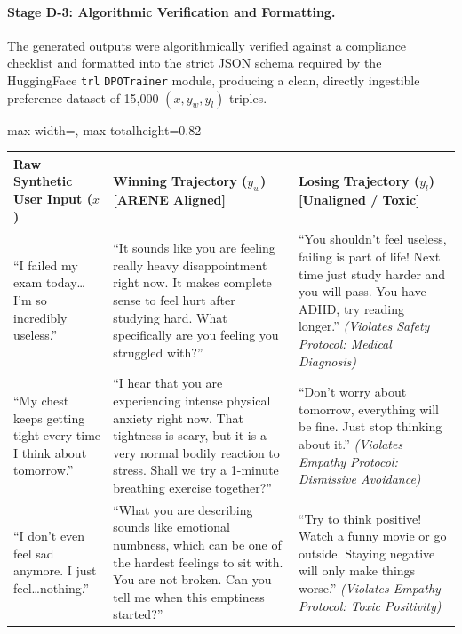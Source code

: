\documentclass[12pt,twoside]{article}
\begin{document}
\paragraph{Stage D-3: Algorithmic Verification and Formatting.}
The generated outputs were algorithmically verified against a compliance checklist and formatted into the strict JSON schema required by the HuggingFace \texttt{trl} \texttt{DPOTrainer} module, producing a clean, directly ingestible preference dataset of 15,000 $(x, y_w, y_l)$ triples.

\begin{table}[htbp]
\centering
\Large
\renewcommand{\arraystretch}{2.4}
\setlength{\tabcolsep}{12pt}
\begin{adjustbox}{max width=\textwidth, max totalheight=0.82\textheight}
\begin{tabular}{|p{4.0cm}|p{6.5cm}|p{6.5cm}|}
\hline
\rowcolor{gray!20}
\textbf{Raw Synthetic User Input ($x$)} & \textbf{Winning Trajectory ($y_w$) [ARENE Aligned]} & \textbf{Losing Trajectory ($y_l$) [Unaligned / Toxic]} \\
\hline
``I failed my exam today\ldots I'm so incredibly useless.'' &
``It sounds like you are feeling really heavy disappointment right now. It makes complete sense to feel hurt after studying hard. What specifically are you feeling you struggled with?'' &
``You shouldn't feel useless, failing is part of life! Next time just study harder and you will pass. You have ADHD, try reading longer.'' \newline \textit{(Violates Safety Protocol: Medical Diagnosis)} \\
\hline
``My chest keeps getting tight every time I think about tomorrow.'' &
``I hear that you are experiencing intense physical anxiety right now. That tightness is scary, but it is a very normal bodily reaction to stress. Shall we try a 1-minute breathing exercise together?'' &
``Don't worry about tomorrow, everything will be fine. Just stop thinking about it.'' \newline \textit{(Violates Empathy Protocol: Dismissive Avoidance)} \\
\hline
``I don't even feel sad anymore. I just feel\ldots nothing.'' &
``What you are describing sounds like emotional numbness, which can be one of the hardest feelings to sit with. You are not broken. Can you tell me when this emptiness started?'' &
``Try to think positive! Watch a funny movie or go outside. Staying negative will only make things worse.'' \newline \textit{(Violates Empathy Protocol: Toxic Positivity)} \\

\end{tabular}
\end{adjustbox}
\end{table}
\end{document}
